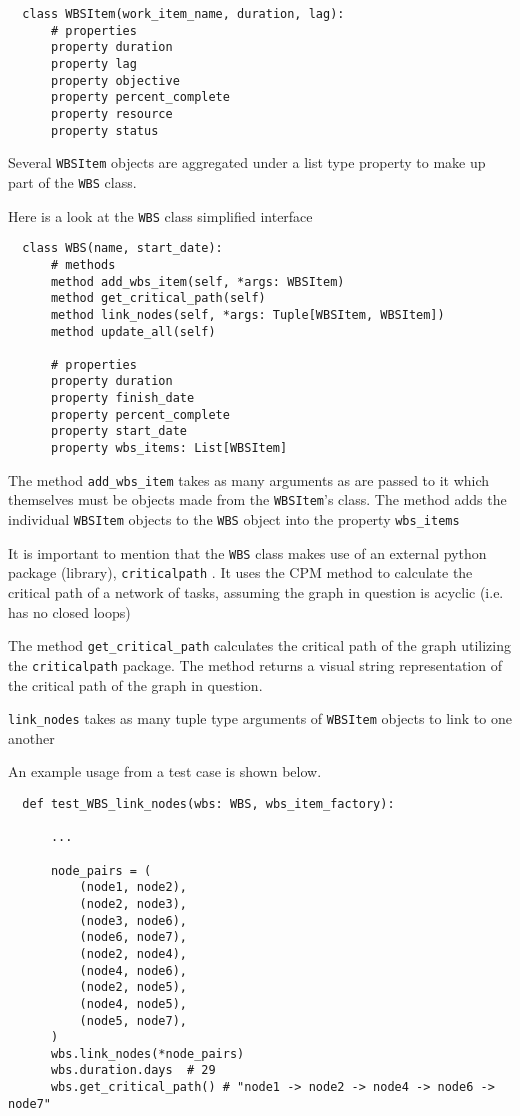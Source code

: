 \begin{lstlisting}
  class WBSItem(work_item_name, duration, lag):
      # properties
      property duration
      property lag
      property objective
      property percent_complete
      property resource
      property status
\end{lstlisting}

Several \verb+WBSItem+ objects are aggregated under a list type property to make up part of the \verb+WBS+ class.

Here is a look at the \verb+WBS+ class simplified interface

\begin{lstlisting}
  class WBS(name, start_date):
      # methods
      method add_wbs_item(self, *args: WBSItem)
      method get_critical_path(self)
      method link_nodes(self, *args: Tuple[WBSItem, WBSItem])
      method update_all(self)

      # properties
      property duration
      property finish_date
      property percent_complete
      property start_date
      property wbs_items: List[WBSItem]
\end{lstlisting}

The method \verb+add_wbs_item+ takes as many arguments as are passed to it which themselves must be objects made from the \verb+WBSItem+'s class. The method adds the individual \verb+WBSItem+ objects to the \verb+WBS+ object into the property \verb+wbs_items+

It is important to mention that the \verb+WBS+ class makes use of an external python package (library), \verb+criticalpath+ \cite{criticalpath}. It uses the CPM method to calculate the critical path of a network of tasks, assuming the graph in question is acyclic (i.e. has no closed loops)

The method \verb+get_critical_path+ calculates the critical path of the graph utilizing the \verb+criticalpath+ package. The method returns a visual string representation of the critical path of the graph in question.

\verb+link_nodes+ takes as many tuple type arguments of \verb+WBSItem+ objects to link to one another

An example usage from a test case is shown below. \linebreak

\begin{lstlisting}
  def test_WBS_link_nodes(wbs: WBS, wbs_item_factory):

      ...

      node_pairs = (
          (node1, node2),
          (node2, node3),
          (node3, node6),
          (node6, node7),
          (node2, node4),
          (node4, node6),
          (node2, node5),
          (node4, node5),
          (node5, node7),
      )
      wbs.link_nodes(*node_pairs)
      wbs.duration.days  # 29
      wbs.get_critical_path() # "node1 -> node2 -> node4 -> node6 -> node7"
\end{lstlisting}

